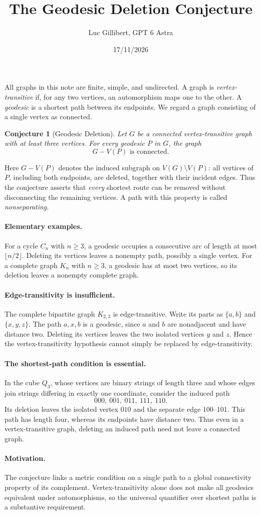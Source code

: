 \documentclass[11pt,a4paper]{article}
\title{The Geodesic Deletion Conjecture}
\author{Luc Gillibert, GPT 6 Astra}
\date{17/11/2026}
\newtheorem{conjecture}{Conjecture}
\begin{document}
\maketitle
\vspace{-2em}

All graphs in this note are finite, simple, and undirected. A graph is
\emph{vertex-transitive} if, for any two vertices, an automorphism maps
one to the other. A \emph{geodesic} is a shortest path between its
endpoints. We regard a graph consisting of a single vertex as connected.

\begin{conjecture}[Geodesic Deletion]
Let $G$ be a connected vertex-transitive graph with at least three
vertices. For every geodesic $P$ in $G$, the graph
\[
  \boxed{G-V(P)\text{ is connected}.}
\]
\end{conjecture}

Here $G-V(P)$ denotes the induced subgraph on
$V(G)\setminus V(P)$: all vertices of $P$, including both endpoints,
are deleted, together with their incident edges. Thus the conjecture
asserts that \emph{every} shortest route can be removed without
disconnecting the remaining vertices. A path with this property is
called \emph{nonseparating}.

\paragraph{Elementary examples.}
For a cycle $C_n$ with $n\geq 3$, a geodesic occupies a consecutive arc
of length at most $\lfloor n/2\rfloor$. Deleting its vertices leaves a
nonempty path, possibly a single vertex. For a complete graph $K_n$
with $n\geq 3$, a geodesic has at most two vertices, so its deletion
leaves a nonempty complete graph.

\paragraph{Edge-transitivity is insufficient.}
The complete bipartite graph $K_{2,3}$ is edge-transitive. Write its
parts as $\{a,b\}$ and $\{x,y,z\}$. The path $a,x,b$ is a geodesic,
since $a$ and $b$ are nonadjacent and have distance two. Deleting its
vertices leaves the two isolated vertices $y$ and $z$. Hence the
vertex-transitivity hypothesis cannot simply be replaced by
edge-transitivity.

\paragraph{The shortest-path condition is essential.}
In the cube $Q_3$, whose vertices are binary strings of length three
and whose edges join strings differing in exactly one coordinate,
consider the induced path
\[
  000,\ 001,\ 011,\ 111,\ 110.
\]
Its deletion leaves the isolated vertex $010$ and the separate edge
$100\text{--}101$. This path has length four, whereas its endpoints
have distance two. Thus even in a vertex-transitive graph, deleting
an induced path need not leave a connected graph.

\paragraph{Motivation.}
The conjecture links a metric condition on a single path to a global
connectivity property of its complement. Vertex-transitivity alone
does not make all geodesics equivalent under automorphisms, so the
universal quantifier over shortest paths is a substantive requirement.
\end{document}
